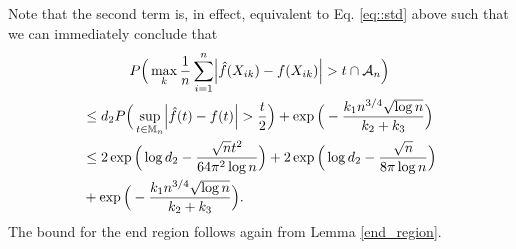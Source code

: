 Note that the second term is, in effect, equivalent to Eq. \eqref{eq::std} above such that we can immediately conclude that
\begin{multline*}
    P\Big(\max_k \frac{1}{n} \sum_{i=1}^n \abs{\hat{f}(X_{ik}) - f(X_{ik})} > t \cap \mathcal{A}_n \Big) \\
    \begin{aligned}
         & \leq d_2P\Big(\sup_{t \in \mathbb{M}_n} \abs{\hat{f}(t) - f(t)} > \frac{t}{2}\Big) + \exp\Big(- \frac{k_1 n^{3/4} \sqrt{\log n}}{k_2+ k_3} \Big) \\
         & \leq 2\exp\Big(\log d_2 -\frac{\sqrt{n}t^2}{64 \pi^2\log n}\Big) + 2\exp\Big(\log d_2 - \frac{\sqrt{n}}{8\pi\log n}\Big)                         \\
         & + \exp\Big(- \frac{k_1 n^{3/4} \sqrt{\log n}}{k_2+ k_3} \Big).
    \end{aligned}
\end{multline*}
The bound for the end region follows again from Lemma \ref{end_region}.

